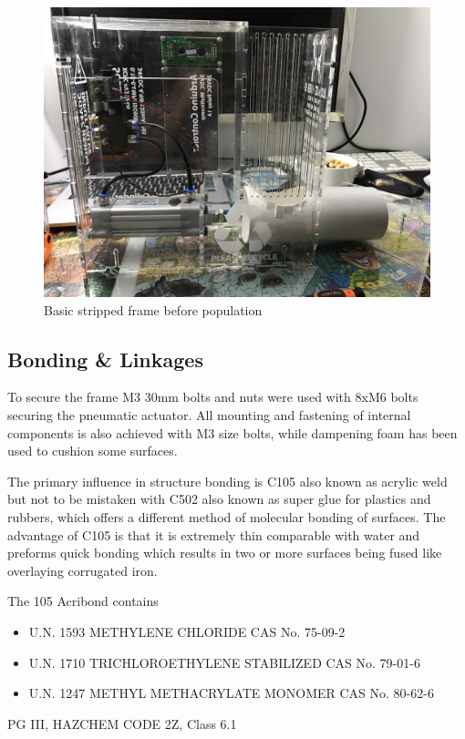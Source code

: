 \documentclass[a4paper, 10pt]{IEEEconf}
\begin{document}
\begin{figure}[H]
  \includegraphics[width=\linewidth]{images/Frame}
  \caption{Basic stripped frame before population}
  \label{fig:Basic stripped frame before population}
\end{figure}


\subsection{Bonding \& Linkages}

To secure the frame M3 30mm bolts and nuts were used with 8xM6 bolts securing the pneumatic actuator. All mounting and fastening of internal components is also achieved with M3 size bolts, while dampening foam has been used to cushion some surfaces.

The primary influence in structure bonding is C105 also known as acrylic weld but not to be mistaken with C502 also known as super glue for plastics and rubbers, which offers a different method of molecular bonding of surfaces. The advantage of C105 is that it is extremely thin comparable with water and preforms quick bonding which results in two or more surfaces being fused like overlaying corrugated iron.

The 105 Acribond contains
\begin{itemize}
	\item U.N. 1593 METHYLENE CHLORIDE CAS No. 75-09-2
	\item U.N. 1710 TRICHLOROETHYLENE STABILIZED CAS No. 79-01-6
	\item U.N. 1247 METHYL METHACRYLATE MONOMER CAS No. 80-62-6
\end{itemize}
PG III, HAZCHEM CODE 2Z, Class 6.1
\end{document}
